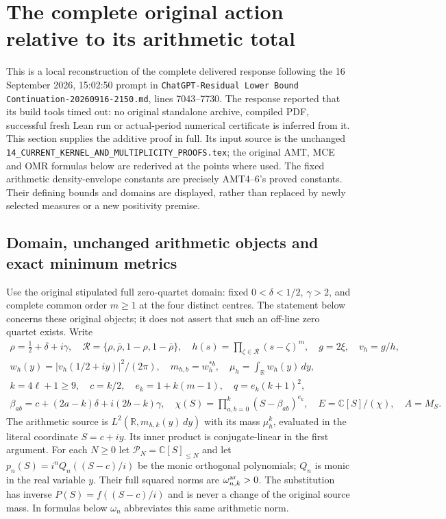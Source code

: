 \documentclass[11pt,a4paper]{article}
\begin{document}
\section{The complete original action relative to its arithmetic total}
\label{sec:complete-action-integration}

This is a local reconstruction of the complete delivered response following
the 16 September 2026, 15:02:50 prompt in
\texttt{ChatGPT-Residual Lower Bound Continuation-20260916-2150.md},
lines 7043--7730. The response reported that its build tools timed out:
no original standalone archive, compiled PDF, successful fresh Lean run or
actual-period numerical certificate is inferred from it. This section
supplies the additive proof in full. Its input source is the unchanged
\texttt{14\_CURRENT\_KERNEL\_AND\_MULTIPLICITY\_PROOFS.tex}; the original
AMT, MCE and OMR formulas below are rederived at the points where used.
The fixed arithmetic density-envelope constants are precisely AMT4--6's
proved constants. Their defining bounds and domains are displayed, rather
than replaced by newly selected measures or a new positivity premise.

\subsection{Domain, unchanged arithmetic objects and exact minimum metrics}

Use the original stipulated full zero-quartet domain: fixed
$0<\delta<1/2$, $\gamma>2$, and complete common order $m\ge1$ at the four
distinct centres. The statement below concerns these original objects; it
does not assert that such an off-line zero quartet exists. Write
\[
\begin{gathered}
 \rho=\tfrac12+\delta+i\gamma,\quad
 \mathcal R=\{\rho,\bar\rho,1-\rho,1-\bar\rho\},\quad
 h(s)=\prod_{\zeta\in\mathcal R}(s-\zeta)^m,\quad g=2\xi,\quad v_h=g/h,\\
 w_h(y)=|v_h(1/2+iy)|^2/(2\pi),\quad m_{h,b}=w_h^{*b},\quad
 \mu_h=\int_{\mathbb R}w_h(y)\,dy,\\
 k=4\ell+1\ge9,\quad c=k/2,\quad e_k=1+k(m-1),\quad
 q=e_k(k+1)^2,\\
 \beta_{ab}=c+(2a-k)\delta+i(2b-k)\gamma,\quad
 \chi(S)=\prod_{a,b=0}^{k}(S-\beta_{ab})^{e_k},\quad
 E=\mathbb C[S]/(\chi),\quad A=M_S.
\end{gathered}\tag{CAI1}
\]
The arithmetic source is $L^2(\mathbb R,m_{h,k}(y)\,dy)$ with its
mass $\mu_h^k$, evaluated in the literal coordinate $S=c+iy$.
Its inner product is conjugate-linear in the first argument. For each
$N\ge0$ let $\mathcal P_N=\mathbb C[S]_{\le N}$ and let
$p_n(S)=i^nQ_n((S-c)/i)$ be the monic orthogonal polynomials; $Q_n$ is
monic in the real variable $y$. Their full squared norms are
$\omega_{n,k}^{\rm ar}>0$. The substitution has inverse
$P(S)=f((S-c)/i)$ and is never a change of the original source mass.
In formulas below $\omega_n$ abbreviates this same arithmetic norm.
\end{document}
